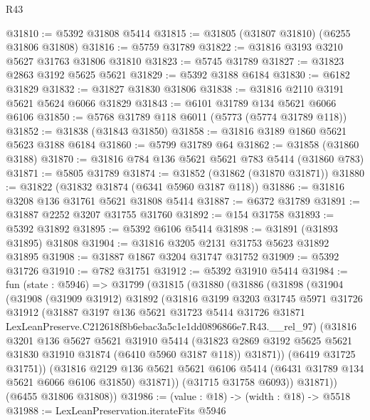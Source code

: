 \begin{lexlean}{R43}
\begin{coremodule}
@31810 := @5392 @31808 @5414
@31815 := @31805 (@31807 @31810) (@6255 @31806 @31808)
@31816 := @5759 @31789
@31822 := @31816 @3193 @3210 @5627 @31763 @31806 @31810
@31823 := @5745 @31789
@31827 := @31823 @2863 @3192 @5625 @5621
@31829 := @5392 @3188 @6184
@31830 := @6182 @31829
@31832 := @31827 @31830 @31806
@31838 := @31816 @2110 @3191 @5621 @5624 @6066 @31829
@31843 := @6101 @31789 @134 @5621 @6066 @6106
@31850 := @5768 @31789 @118 @6011 (@5773 (@5774 @31789 @118))
@31852 := @31838 (@31843 @31850)
@31858 := @31816 @3189 @1860 @5621 @5623 @3188 @6184
@31860 := @5799 @31789 @64
@31862 := @31858 (@31860 @3188)
@31870 := @31816 @784 @136 @5621 @5621 @783 @5414 (@31860 @783)
@31871 := @5805 @31789
@31874 := @31852 (@31862 (@31870 @31871))
@31880 := @31822 (@31832 @31874 (@6341 @5960 @3187 @118))
@31886 := @31816 @3208 @136 @31761 @5621 @31808 @5414
@31887 := @6372 @31789
@31891 := @31887 @2252 @3207 @31755 @31760
@31892 := @154 @31758
@31893 := @5392 @31892
@31895 := @5392 @6106 @5414
@31898 := @31891 (@31893 @31895) @31808
@31904 := @31816 @3205 @2131 @31753 @5623 @31892 @31895
@31908 := @31887 @1867 @3204 @31747 @31752
@31909 := @5392 @31726
@31910 := @782 @31751
@31912 := @5392 @31910 @5414
@31984 := fun (state : @5946) =>
  @31799
    (@31815
      (@31880
        (@31886
          (@31898
            (@31904
              (@31908
                (@31909 @31912)
                @31892
                (@31816
                  @3199
                  @3203
                  @31745
                  @5971
                  @31726
                  @31912
                  (@31887
                    @3197
                    @136
                    @5621
                    @31723
                    @5414
                    @31726
                    @31871
                    LexLeanPreserve.C212618f8b6ebac3a5c1e1dd0896866e7.R43.__rel_97)
                  (@31816
                    @3201
                    @136
                    @5627
                    @5621
                    @31910
                    @5414
                    (@31823 @2869 @3192 @5625 @5621 @31830 @31910 @31874 (@6410 @5960 @3187 @118))
                    @31871))
                (@6419 @31725 @31751))
              (@31816
                @2129
                @136
                @5621
                @5621
                @6106
                @5414
                (@6431 @31789 @134 @5621 @6066 @6106 @31850)
                @31871))
            (@31715 @31758 @6093))
          @31871))
      (@6455 @31806 @31808))
@31986 := (value : @18) -> (width : @18) -> @5518
@31988 := LexLeanPreservation.iterateFits @5946

\end{coremodule}
\end{lexlean}

